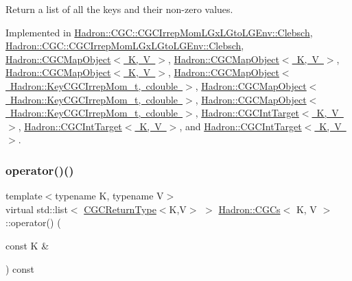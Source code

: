 Return a list of all the keys and their non-\/zero values. 



Implemented in \mbox{\hyperlink{classHadron_1_1CGC_1_1CGCIrrepMomLGxLGtoLGEnv_1_1Clebsch_a27a81332c929b1f421704680e794b796}{Hadron\+::\+C\+G\+C\+::\+C\+G\+C\+Irrep\+Mom\+L\+Gx\+L\+Gto\+L\+G\+Env\+::\+Clebsch}}, \mbox{\hyperlink{classHadron_1_1CGC_1_1CGCIrrepMomLGxLGtoLGEnv_1_1Clebsch_a27a81332c929b1f421704680e794b796}{Hadron\+::\+C\+G\+C\+::\+C\+G\+C\+Irrep\+Mom\+L\+Gx\+L\+Gto\+L\+G\+Env\+::\+Clebsch}}, \mbox{\hyperlink{classHadron_1_1CGCMapObject_aaa4b18e1a2845e16154cd434462c0779}{Hadron\+::\+C\+G\+C\+Map\+Object$<$ K, V $>$}}, \mbox{\hyperlink{classHadron_1_1CGCMapObject_aaa4b18e1a2845e16154cd434462c0779}{Hadron\+::\+C\+G\+C\+Map\+Object$<$ K, V $>$}}, \mbox{\hyperlink{classHadron_1_1CGCMapObject_aaa4b18e1a2845e16154cd434462c0779}{Hadron\+::\+C\+G\+C\+Map\+Object$<$ K, V $>$}}, \mbox{\hyperlink{classHadron_1_1CGCMapObject_aaa4b18e1a2845e16154cd434462c0779}{Hadron\+::\+C\+G\+C\+Map\+Object$<$ Hadron\+::\+Key\+C\+G\+C\+Irrep\+Mom\+\_\+t, cdouble $>$}}, \mbox{\hyperlink{classHadron_1_1CGCMapObject_aaa4b18e1a2845e16154cd434462c0779}{Hadron\+::\+C\+G\+C\+Map\+Object$<$ Hadron\+::\+Key\+C\+G\+C\+Irrep\+Mom\+\_\+t, cdouble $>$}}, \mbox{\hyperlink{classHadron_1_1CGCMapObject_aaa4b18e1a2845e16154cd434462c0779}{Hadron\+::\+C\+G\+C\+Map\+Object$<$ Hadron\+::\+Key\+C\+G\+C\+Irrep\+Mom\+\_\+t, cdouble $>$}}, \mbox{\hyperlink{classHadron_1_1CGCIntTarget_ae6c0ce90fe1f8a2880984df1e2e44c18}{Hadron\+::\+C\+G\+C\+Int\+Target$<$ K, V $>$}}, \mbox{\hyperlink{classHadron_1_1CGCIntTarget_ae6c0ce90fe1f8a2880984df1e2e44c18}{Hadron\+::\+C\+G\+C\+Int\+Target$<$ K, V $>$}}, and \mbox{\hyperlink{classHadron_1_1CGCIntTarget_ae6c0ce90fe1f8a2880984df1e2e44c18}{Hadron\+::\+C\+G\+C\+Int\+Target$<$ K, V $>$}}.

\mbox{\label{classHadron_1_1CGCs_a8d2d80be37b603359708ebdd5923ff47}} 
\subsubsection{\texorpdfstring{operator()()}{operator()()}\hspace{0.1cm}{\footnotesize\ttfamily [4/6]}}
{\footnotesize\ttfamily template$<$typename K, typename V$>$ \\
virtual std\+::list$<$ \mbox{\hyperlink{structHadron_1_1CGCReturnType}{C\+G\+C\+Return\+Type}}$<$K,V$>$ $>$ \mbox{\hyperlink{classHadron_1_1CGCs}{Hadron\+::\+C\+G\+Cs}}$<$ K, V $>$\+::operator() (\begin{DoxyParamCaption}\item[{const K \&}]{ }\end{DoxyParamCaption}) const\hspace{0.3cm}{\ttfamily [pure virtual]}}



